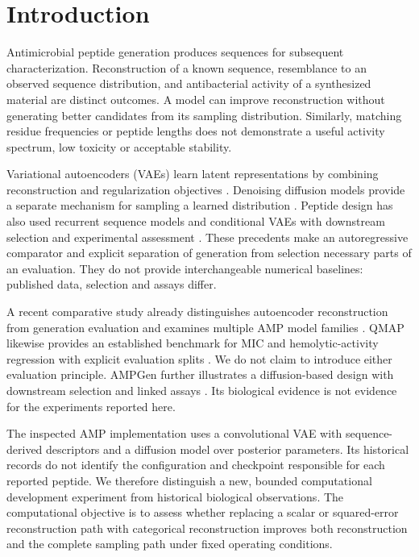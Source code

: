 \documentclass[12pt,a4paper]{article}
\begin{document}
\section{Introduction}
Antimicrobial peptide generation produces sequences for subsequent characterization. Reconstruction of a known sequence, resemblance to an observed sequence distribution, and antibacterial activity of a synthesized material are distinct outcomes. A model can improve reconstruction without generating better candidates from its sampling distribution. Similarly, matching residue frequencies or peptide lengths does not demonstrate a useful activity spectrum, low toxicity or acceptable stability.

Variational autoencoders (VAEs) learn latent representations by combining reconstruction and regularization objectives \citep{kingma2014}. Denoising diffusion models provide a separate mechanism for sampling a learned distribution \citep{ho2020}. Peptide design has also used recurrent sequence models \citep{muller2018} and conditional VAEs with downstream selection and experimental assessment \citep{szymczak2023}. These precedents make an autoregressive comparator and explicit separation of generation from selection necessary parts of an evaluation. They do not provide interchangeable numerical baselines: published data, selection and assays differ.

A recent comparative study already distinguishes autoencoder reconstruction from generation evaluation and examines multiple AMP model families \citep{beierle2026}. QMAP likewise provides an established benchmark for MIC and hemolytic-activity regression with explicit evaluation splits \citep{qmap2026}. We do not claim to introduce either evaluation principle. AMPGen further illustrates a diffusion-based design with downstream selection and linked assays \citep{ampgen2025}. Its biological evidence is not evidence for the experiments reported here.

The inspected AMP implementation uses a convolutional VAE with sequence-derived descriptors and a diffusion model over posterior parameters. Its historical records do not identify the configuration and checkpoint responsible for each reported peptide. We therefore distinguish a new, bounded computational development experiment from historical biological observations. The computational objective is to assess whether replacing a scalar or squared-error reconstruction path with categorical reconstruction improves both reconstruction and the complete sampling path under fixed operating conditions.
\end{document}

